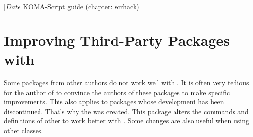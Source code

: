 %
%
%
%
%
%
%
%
% 
%
%
%
%

                 [$Date$
                  KOMA-Script guide (chapter: scrhack)]


\chapter{Improving Third-Party Packages with }

\BeginIndexGroup
{}
Some packages from other authors do not work well with \KOMAScript{}. It is
often very tedious for the author of \KOMAScript{} to convince the authors of
these packages to make specific improvements. This also applies to packages
whose development has been discontinued. That's why the  was
created. This package alters the commands and definitions of other to work
better with \KOMAScript{}. Some changes are also useful when using other
classes.


